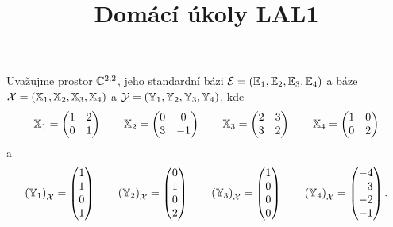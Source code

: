 \documentclass{article}
\title{Domácí úkoly LAL1}
\newcommand{\mathbasis}{\ensuremath{\mathcal}}
\newcommand{\mathfield}{\ensuremath{\mathbb}}
\newcommand{\mathmat}{\ensuremath{\mathbb}}
\begin{document}
\maketitle

\begin{Exercise}[name=Úkol, label=bases]
	Uvažujme prostor \( \mathfield{C}^{2, 2} \), jeho standardní bázi \( \mathbasis{E} = \left( \mathmat{E}_1, \mathmat{E}_2, \mathmat{E}_3, \mathmat{E}_4 \right) \) a báze \( \mathbasis{X} = \left( \mathmat{X}_1, \mathmat{X}_2, \mathmat{X}_3, \mathmat{X}_4 \right) \) a \( \mathbasis{Y} = \left( \mathmat{Y}_1, \mathmat{Y}_2, \mathmat{Y}_3, \mathmat{Y}_4 \right) \), kde
	\[
		\mathmat{X}_1 = \begin{pmatrix} 1 & 2 \\ 0 & 1 \end{pmatrix} \qquad
		\mathmat{X}_2 = \begin{pmatrix} 0 & 0 \\ 3 & -1 \end{pmatrix} \qquad
		\mathmat{X}_3 = \begin{pmatrix} 2 & 3 \\ 3 & 2 \end{pmatrix} \qquad
		\mathmat{X}_4 = \begin{pmatrix} 1 & 0 \\ 0 & 2 \end{pmatrix}
	\]
	a
	\[
		\left( \mathmat{Y}_1 \right)_\mathbasis{X} = \begin{pmatrix} 1 \\ 1 \\ 0 \\ 1 \end{pmatrix} \qquad
		\left( \mathmat{Y}_2 \right)_\mathbasis{X} = \begin{pmatrix} 0 \\ 1 \\ 0 \\ 2 \end{pmatrix} \qquad
		\left( \mathmat{Y}_3 \right)_\mathbasis{X} = \begin{pmatrix} 1 \\ 0 \\ 0 \\ 0 \end{pmatrix} \qquad
		\left( \mathmat{Y}_4 \right)_\mathbasis{X} = \begin{pmatrix} -4 \\ -3 \\ -2 \\ -1 \end{pmatrix} \text{.}
\]
\end{Exercise}
\end{document}
